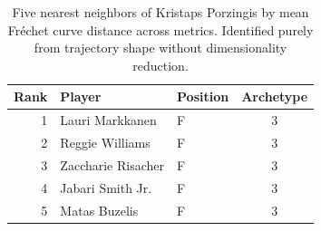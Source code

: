 \begin{table}[htbp]
  \centering\small
  \begin{tabular}{rllc}
    \toprule
    Rank & Player & Position & Archetype \\
    \midrule
    1 & Lauri Markkanen & F & 3 \\
    2 & Reggie Williams & F & 3 \\
    3 & Zaccharie Risacher & F & 3 \\
    4 & Jabari Smith Jr. & F & 3 \\
    5 & Matas Buzelis & F & 3 \\
    \bottomrule
  \end{tabular}
  \caption{Five nearest neighbors of Kristaps Porzingis by mean Fr\'{e}chet curve distance across metrics. Identified purely from trajectory shape without dimensionality reduction.}
  \label{tab:Kristaps_Porzingis_frechet_curve_neighbors}
\end{table}

